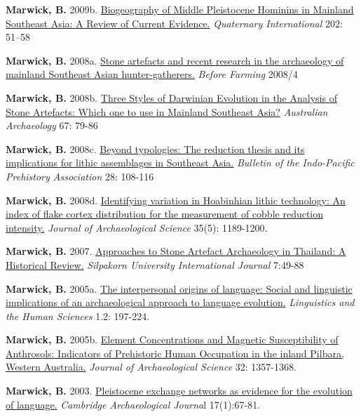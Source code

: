 \documentclass[11pt,article,oneside]{memoir}
\begin{document}
{{{{\ind \textbf{Marwick, B.}  2009b. \href{http://faculty.washington.edu/bmarwick/PDFs/Marwick_2009_QI.pdf}{Biogeography of Middle Pleistocene Hominins in Mainland Southeast Asia: A Review of Current Evidence.} \textit{Quaternary International} 202: 51–58

\ind \textbf{Marwick, B.} 2008a. \href{http://faculty.washington.edu/bmarwick/PDFs/Marwick_2008_Before_Farming.pdf}{Stone artefacts and recent research in the archaeology of mainland Southeast Asian hunter-gatherers.} \textit{Before Farming} 2008/4

\ind \textbf{Marwick, B.} 2008b. \href{http://faculty.washington.edu/bmarwick/PDFs/Marwick_2008_AA_3_Styles.pdf}{Three Styles of Darwinian Evolution in the Analysis of Stone Artefacts: Which one to use in Mainland Southeast Asia?} \textit{Australian Archaeology} 67: 79-86

\ind \textbf{Marwick, B.} 2008c. \href{http://faculty.washington.edu/bmarwick/PDFs/Marwick_2008_BIPPA.pdf}{Beyond typologies: The reduction thesis and its implications for lithic assemblages in Southeast Asia.} \textit{Bulletin of the Indo-Pacific Prehistory Association} 28: 108-116

\ind \textbf{Marwick, B.} 2008d. \href{http://faculty.washington.edu/bmarwick/PDFs/Marwick_2008_JAS.pdf}{Identifying variation in Hoabinhian lithic technology: An index of flake cortex distribution for the measurement of cobble reduction intensity.} \textit{ Journal of Archaeological Science} 35(5): 1189-1200.

\ind \textbf{Marwick, B.} 2007. \href{http://faculty.washington.edu/bmarwick/PDFs/Marwick_2007_SIJ.pdf}{Approaches to Stone Artefact Archaeology in Thailand: A Historical Review.} \textit{Silpakorn University International Journal} 7:49-88

\ind \textbf{Marwick, B.} 2005a. \href{http://faculty.washington.edu/bmarwick/PDFs/Marwick_2005_LHE.pdf}{The interpersonal origins of language: Social and linguistic implications of an archaeological approach to language evolution.} \textit{Linguistics and the Human Sciences} 1.2: 197-224.

\ind \textbf{Marwick, B.} 2005b. \href{http://faculty.washington.edu/bmarwick/PDFs/Marwick_2005_JAS.pdf}{Element Concentrations and Magnetic Susceptibility of Anthrosols: Indicators of Prehistoric Human Occupation in the inland Pilbara, Western Australia.} \textit{Journal of Archaeological Science} 32: 1357-1368.

\ind \textbf{Marwick, B.} 2003. \href{http://faculty.washington.edu/bmarwick/PDFs/Marwick_2003_CAJ.pdf}{Pleistocene exchange networks as evidence for the evolution of language.} \textit{Cambridge Archaeological Journa}l 17(1):67-81.

}}}}
\end{document}
